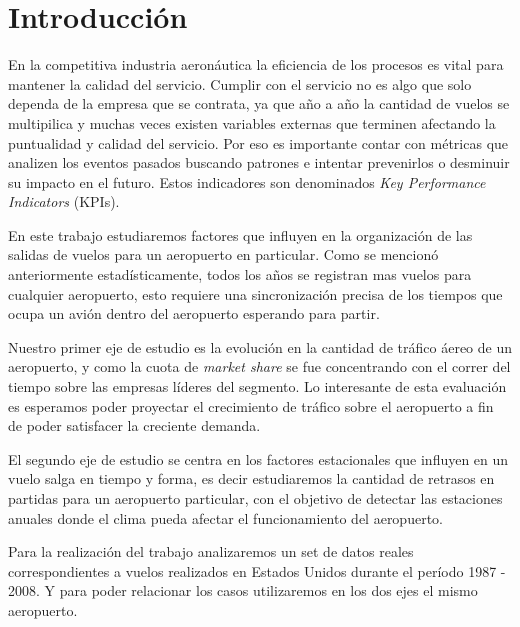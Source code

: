 \documentclass{endm}
\begin{document}
\section{Introducci\'on}\label{intro}


En la competitiva industria aeron\'autica la eficiencia de los procesos es vital para mantener la calidad del servicio. Cumplir con el servicio no es algo que solo dependa de la empresa que se contrata, ya que a\~no a a\~no la cantidad de vuelos se multipilica y muchas veces existen variables externas que terminen afectando la puntualidad y calidad del servicio. Por eso es importante contar con m\'etricas que analizen los eventos pasados buscando patrones e intentar prevenirlos o desminuir su impacto en el futuro. Estos indicadores son denominados \textit{Key Performance Indicators} (KPIs).

En este trabajo estudiaremos factores que influyen en la organizaci\'on de las salidas de vuelos para un aeropuerto en particular. Como se mencion\'o anteriormente estad\'isticamente, todos los a\~nos se registran mas vuelos para cualquier aeropuerto, esto requiere una sincronizaci\'on precisa de los tiempos que ocupa un avi\'on dentro del aeropuerto esperando para partir.

Nuestro primer eje de estudio es la evoluci\'on en la cantidad de tr\'afico \'aereo de un aeropuerto, y como la cuota de \textit{market share} se fue concentrando con el correr del tiempo sobre las empresas l\'ideres del segmento. Lo interesante de esta evaluaci\'on es esperamos poder proyectar el crecimiento de tr\'afico sobre el aeropuerto a fin de poder satisfacer la creciente demanda.

El segundo eje de estudio se centra en los factores estacionales que influyen en un vuelo salga en tiempo y forma, es decir estudiaremos la cantidad de retrasos en partidas para un aeropuerto particular, con el objetivo de detectar las estaciones anuales donde el clima pueda afectar el funcionamiento del aeropuerto.

Para la realización del trabajo analizaremos un set de datos reales correspondientes a vuelos realizados en Estados Unidos durante el per\'iodo 1987 - 2008. Y para poder relacionar los casos utilizaremos en los dos ejes el mismo aeropuerto.
\end{document}
